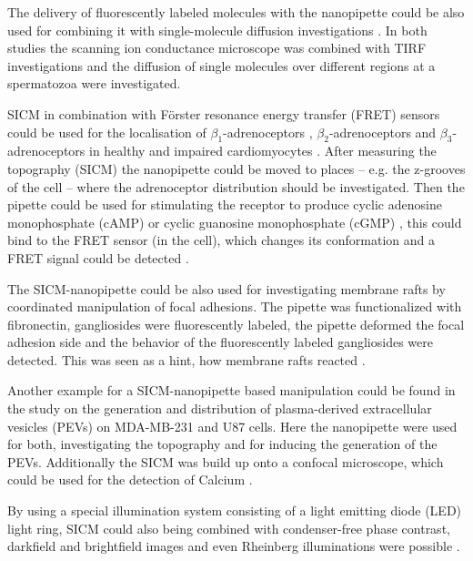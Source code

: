 The delivery of fluorescently labeled molecules with the nanopipette could be also used for 
combining it with single-molecule diffusion investigations \cite{Bruckbauer2007, Bruckbauer2010}. 
In both studies the scanning ion conductance microscope was combined with TIRF investigations and 
the diffusion of single molecules over different regions at a spermatozoa were investigated. 

SICM in combination with Förster resonance energy transfer (FRET) sensors could be used for
the localisation of $\beta_{1}$-adrenoceptors \cite{Wright2018}, $\beta_{2}$-adrenoceptors 
\cite{Nikolaev2010,Lyon2012,Wright2014,Wright2018} and $\beta_{3}$-adrenoceptors 
\cite{Schobesberger2020} in healthy and impaired cardiomyocytes \cite{Wright2015,Berisha2017}. 
After measuring the topography (SICM) the nanopipette could be moved to places -- e.g. the 
z-grooves of the cell \cite{Gorelik2006,Lyon2009,Miragoli2011,Lyon2012,Rivaud2017} -- where the 
adrenoceptor distribution should be investigated. Then the pipette could be used for stimulating 
the receptor to produce cyclic adenosine monophosphate (cAMP) or cyclic guanosine monophosphate 
(cGMP) \cite{Xiang2003}, this could bind to the FRET sensor (in the cell), which changes its 
conformation and a FRET signal could be detected \cite{Nikolaev2010}.

The SICM-nanopipette could be also used for investigating membrane rafts 
\cite{Simons1997,Pike2006} by coordinated manipulation of focal adhesions. The pipette was 
functionalized with fibronectin, gangliosides were fluorescently labeled, the pipette deformed the 
focal adhesion side and the behavior of the fluorescently labeled gangliosides were detected. This 
was seen as a hint, how membrane rafts reacted \cite{Fuentes2012}. 

Another example for a SICM-nanopipette based manipulation could be found in the study on the 
generation and distribution of plasma-derived extracellular vesicles (PEVs) on MDA-MB-231 and U87 
cells. Here the nanopipette were used for both, investigating the topography and for inducing the 
generation of the PEVs. Additionally the SICM was build up onto a confocal microscope, which could 
be used for the detection of Calcium \cite{Wang2020}.


By using a special illumination system consisting of a light emitting diode (LED) light ring, SICM 
could also being combined with condenser-free phase contrast, darkfield and brightfield images and 
even Rheinberg illuminations were possible \cite{Webb2014}.


